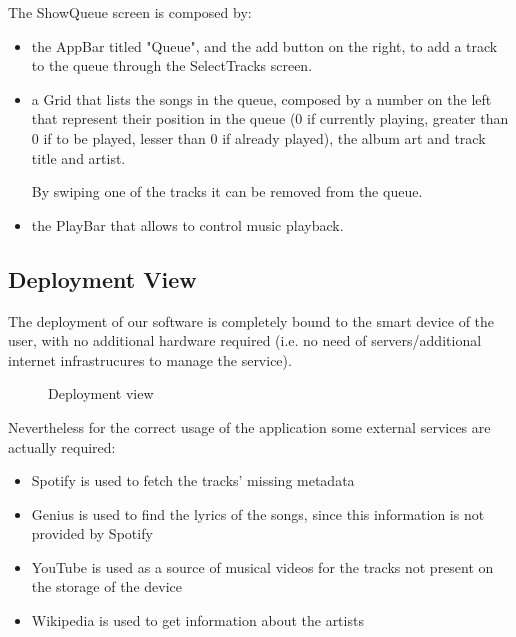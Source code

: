 \documentclass{article}
\begin{document}
The ShowQueue screen is composed by:
\begin{itemize}
    \item the AppBar titled "Queue", and the
        add button on the right, to add a track to the queue through the
        SelectTracks screen.
    \item a Grid that lists the songs in the queue, composed by a number on the
        left that represent their position in the queue (0 if currently playing,
        greater than 0 if to be played, lesser than 0 if already played), the
        album art and track title and artist.

        By swiping one of the tracks it can be removed from the queue.
    \item the PlayBar that allows to control music playback.
\end{itemize}

\subsection{Deployment View}

The deployment of our software is completely bound to the smart device of the
user, with no additional hardware required (i.e. no need of servers/additional
internet infrastrucures to manage the service). 

\begin{figure}[H]
	\noindent
	\caption{Deployment view}
\end{figure}

Nevertheless for the correct usage of the application some external services are
actually required: 

\begin{itemize}
    \item Spotify is used to fetch the tracks' missing metadata
    \item Genius is used to find the lyrics of the songs, since this information
    is not provided by Spotify
    \item YouTube is used as a source of musical videos for the tracks not
    present on the storage of the device
    \item Wikipedia is used to get information about the artists
\end{itemize}
\end{document}
